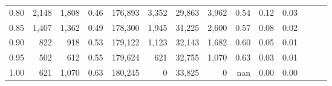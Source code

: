 \begin{tabular}{rrrrrrrrrrrrrr}
0.80 &   2,148 &  1,808 &  0.46 &  176,893 &    3,352 &  29,863 &   3,962 &  0.54 &  0.12 &      0.03 \\
0.85 &   1,407 &  1,362 &  0.49 &  178,300 &    1,945 &  31,225 &   2,600 &  0.57 &  0.08 &      0.02 \\
0.90 &     822 &    918 &  0.53 &  179,122 &    1,123 &  32,143 &   1,682 &  0.60 &  0.05 &      0.01 \\
0.95 &     502 &    612 &  0.55 &  179,624 &      621 &  32,755 &   1,070 &  0.63 &  0.03 &      0.01 \\
1.00 &     621 &  1,070 &  0.63 &  180,245 &        0 &  33,825 &       0 &   nan &  0.00 &      0.00 \\
\bottomrule
\end{tabular}
